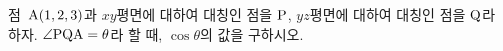 점~$\mathrm{A}(1{,}\mkern3mu\mathopen{}2{,}\mkern3mu\mathopen{}3)$과 $xy$평면에 대하여 대칭인 점을 $\mathrm{P}$, $yz$평면에 대하여 대칭인 점을 $\mathrm{Q}$라 하자. $\angle\mathrm{PQA}=\theta$라 할 때, $\cos\theta$의 값을 구하시오.
